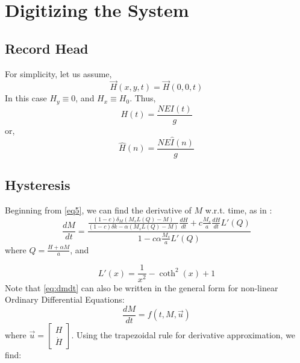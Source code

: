 \documentclass[twoside,a4paper]{article}
\begin{document}
\section{Digitizing the System}
\subsection{Record Head}
For simplicity, let us assume,
\begin{equation}
    \vec{H}(x,y,t) = \vec{H}(0,0,t)
\end{equation}
%
In this case $H_y \equiv 0$, and $H_x \equiv H_0$. Thus,
\begin{equation}
    H(t) = \frac{NEI(t)}{g}
    \label{eq15}
\end{equation}
%
or,
\begin{equation}
    \hat{H}(n) = \frac{NE\hat{I}(n)}{g}
\end{equation}

\subsection{Hysteresis}
Beginning from \cref{eq5}, we can find the derivative of $M$ w.r.t. time,
as in \cite{Hysteresis}:
\begin{equation}
    \frac{dM}{dt} = \frac{\frac{(1-c) \delta_M (M_sL(Q) - M)}{(1-c) \delta k - \alpha (M_sL(Q) - M)} \frac{dH}{dt} + c \frac{M_s}{a} \frac{dH}{dt} L'(Q)}{1 - c \alpha \frac{M_s}{a} L'(Q)}
    \label{eq:dmdt}
\end{equation}
%
where $Q = \frac{H + \alpha M}{a}$, and

\begin{equation}
    L'(x) = \frac{1}{x^2} - \coth^2(x) + 1
\end{equation}
%
Note that \cref{eq:dmdt} can also be written in the general form for non-linear
Ordinary Differential Equations:
\begin{equation}
    \frac{dM}{dt} = f(t,M,\vec{u})
\end{equation}
where $\vec{u} = \begin{bmatrix}
    H \\
    \dot{H}
    \end{bmatrix}$.
\newline\newline
Using the trapezoidal rule for derivative approximation, we find:
\end{document}
